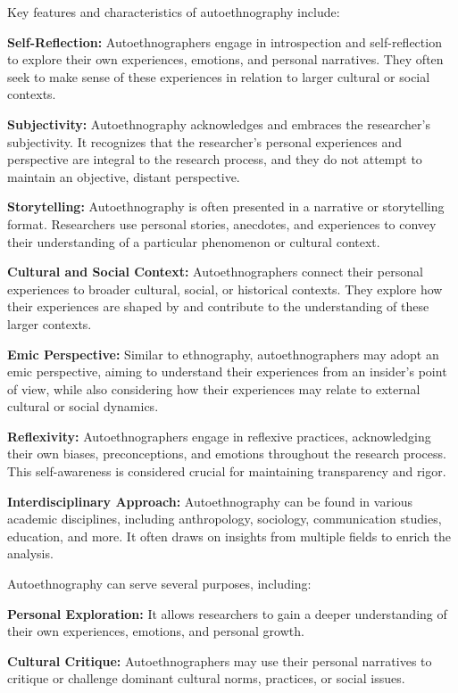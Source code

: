 \documentclass[
  b5paper]{book}
\begin{document}
Key features and characteristics of autoethnography include:

\textbf{Self-Reflection:} Autoethnographers engage in introspection and self-reflection to explore their own experiences, emotions, and personal narratives. They often seek to make sense of these experiences in relation to larger cultural or social contexts.

\textbf{Subjectivity:} Autoethnography acknowledges and embraces the researcher's subjectivity. It recognizes that the researcher's personal experiences and perspective are integral to the research process, and they do not attempt to maintain an objective, distant perspective.

\textbf{Storytelling:} Autoethnography is often presented in a narrative or storytelling format. Researchers use personal stories, anecdotes, and experiences to convey their understanding of a particular phenomenon or cultural context.

\textbf{Cultural and Social Context:} Autoethnographers connect their personal experiences to broader cultural, social, or historical contexts. They explore how their experiences are shaped by and contribute to the understanding of these larger contexts.

\textbf{Emic Perspective:} Similar to ethnography, autoethnographers may adopt an emic perspective, aiming to understand their experiences from an insider's point of view, while also considering how their experiences may relate to external cultural or social dynamics.

\textbf{Reflexivity:} Autoethnographers engage in reflexive practices, acknowledging their own biases, preconceptions, and emotions throughout the research process. This self-awareness is considered crucial for maintaining transparency and rigor.

\textbf{Interdisciplinary Approach:} Autoethnography can be found in various academic disciplines, including anthropology, sociology, communication studies, education, and more. It often draws on insights from multiple fields to enrich the analysis.

Autoethnography can serve several purposes, including:

\textbf{Personal Exploration:} It allows researchers to gain a deeper understanding of their own experiences, emotions, and personal growth.

\textbf{Cultural Critique:} Autoethnographers may use their personal narratives to critique or challenge dominant cultural norms, practices, or social issues.
\end{document}
